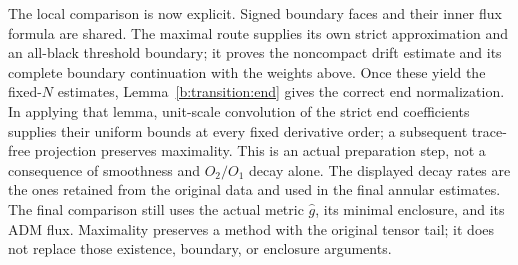 The local comparison is now explicit.  Signed boundary faces and their
inner flux formula are shared.  The maximal route supplies its own
strict approximation and an all-black threshold boundary; it proves
the noncompact drift estimate and its complete boundary continuation
with the weights above.  Once these yield the fixed-$N$ estimates,
Lemma~\ref{b:transition:end} gives the correct end normalization.
In applying that lemma, unit-scale convolution of the strict end
coefficients supplies their uniform bounds at every fixed derivative
order; a subsequent trace-free projection preserves maximality.  This
is an actual preparation step, not a consequence of smoothness and
$O_2/O_1$ decay alone.  The displayed decay rates are the ones retained
from the original data and used in the final annular estimates.
The final comparison still uses the actual metric $\widehat g$, its
minimal enclosure, and its ADM flux.  Maximality preserves a method
with the original tensor tail; it does not replace those existence,
boundary, or enclosure arguments.

